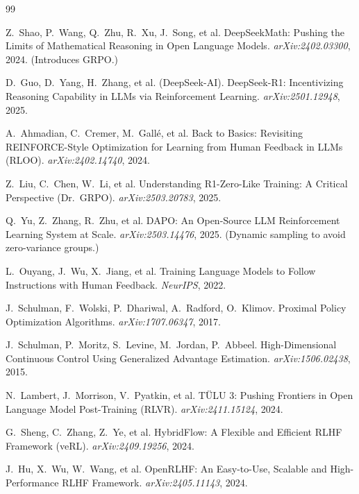 \documentclass[12pt,a4paper]{report}
\begin{document}
\begin{thebibliography}{99}
\small

Z.~Shao, P.~Wang, Q.~Zhu, R.~Xu, J.~Song, et al.
\newblock DeepSeekMath: Pushing the Limits of Mathematical Reasoning in Open Language Models.
\newblock \emph{arXiv:2402.03300}, 2024. (Introduces GRPO.)

D.~Guo, D.~Yang, H.~Zhang, et al. (DeepSeek-AI).
\newblock DeepSeek-R1: Incentivizing Reasoning Capability in LLMs via Reinforcement Learning.
\newblock \emph{arXiv:2501.12948}, 2025.

A.~Ahmadian, C.~Cremer, M.~Gall\'e, et al.
\newblock Back to Basics: Revisiting REINFORCE-Style Optimization for Learning from Human Feedback in LLMs (RLOO).
\newblock \emph{arXiv:2402.14740}, 2024.

Z.~Liu, C.~Chen, W.~Li, et al.
\newblock Understanding R1-Zero-Like Training: A Critical Perspective (Dr.\ GRPO).
\newblock \emph{arXiv:2503.20783}, 2025.

Q.~Yu, Z.~Zhang, R.~Zhu, et al.
\newblock DAPO: An Open-Source LLM Reinforcement Learning System at Scale.
\newblock \emph{arXiv:2503.14476}, 2025. (Dynamic sampling to avoid zero-variance groups.)

L.~Ouyang, J.~Wu, X.~Jiang, et al.
\newblock Training Language Models to Follow Instructions with Human Feedback.
\newblock \emph{NeurIPS}, 2022.

J.~Schulman, F.~Wolski, P.~Dhariwal, A.~Radford, O.~Klimov.
\newblock Proximal Policy Optimization Algorithms.
\newblock \emph{arXiv:1707.06347}, 2017.

J.~Schulman, P.~Moritz, S.~Levine, M.~Jordan, P.~Abbeel.
\newblock High-Dimensional Continuous Control Using Generalized Advantage Estimation.
\newblock \emph{arXiv:1506.02438}, 2015.

N.~Lambert, J.~Morrison, V.~Pyatkin, et al.
\newblock T\"ULU 3: Pushing Frontiers in Open Language Model Post-Training (RLVR).
\newblock \emph{arXiv:2411.15124}, 2024.

G.~Sheng, C.~Zhang, Z.~Ye, et al.
\newblock HybridFlow: A Flexible and Efficient RLHF Framework (veRL).
\newblock \emph{arXiv:2409.19256}, 2024.

J.~Hu, X.~Wu, W.~Wang, et al.
\newblock OpenRLHF: An Easy-to-Use, Scalable and High-Performance RLHF Framework.
\newblock \emph{arXiv:2405.11143}, 2024.


\end{thebibliography}
\end{document}
